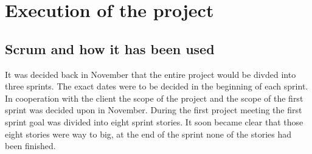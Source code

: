 


\section{Execution of the project}
\subsection{Scrum and how it has been used}
It was decided back in November that the entire project would be divded into three sprints.
The exact dates were to be decided in the beginning of each sprint.
In cooperation with the client the scope of the project and the scope of the first sprint was decided upon in November.
During the first project meeting the first sprint goal was divided into eight sprint stories.
It soon became clear that those eight stories were way to big, at the end of the sprint none of the stories had been finished.

